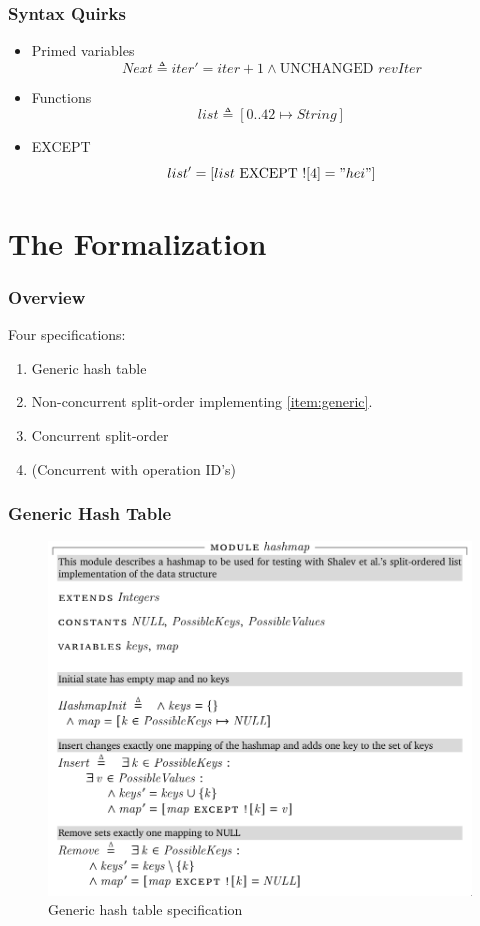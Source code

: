 \documentclass{beamer}
\begin{document}

\begin{frame}
  \frametitle{Syntax Quirks}
  \begin{itemize}
  \item Primed variables
    \[ Next \triangleq iter' = iter + 1 \land \text{UNCHANGED } revIter \]
  \item Functions
    \[ list \triangleq [0..42 \mapsto String] \]
  \item EXCEPT
    \[ list' = [list \text{ EXCEPT } ![4] = "hei"] \]
  \end{itemize}
\end{frame}


\section{The Formalization}

\begin{frame}
  \frametitle{Overview}
  Four specifications:
  \begin{enumerate}
  \item Generic hash table\label{item:generic}
  \item Non-concurrent split-order implementing \autoref{item:generic}.
  \item Concurrent split-order
  \item (Concurrent with operation ID's)
  \end{enumerate}
\end{frame}

\begin{frame}
  \frametitle{Generic Hash Table}
  \begin{figure}
    \includegraphics[height=.7\paperheight]{figures/generic}
    \caption{Generic hash table specification}
    \label{fig:generic}
  \end{figure}
\end{frame}
\end{document}
